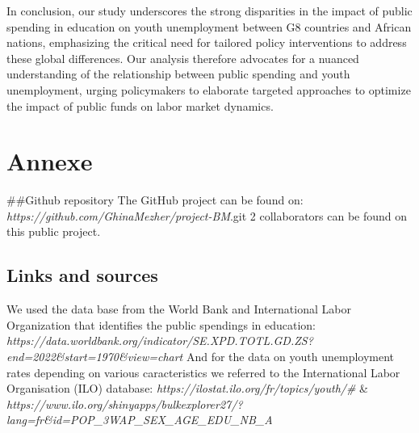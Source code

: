 \documentclass[
  letterpaper,
  DIV=11,
  numbers=noendperiod]{scrartcl}
\begin{document}
In conclusion, our study underscores the strong disparities in the
impact of public spending in education on youth unemployment between G8
countries and African nations, emphasizing the critical need for
tailored policy interventions to address these global differences. Our
analysis therefore advocates for a nuanced understanding of the
relationship between public spending and youth unemployment, urging
policymakers to elaborate targeted approaches to optimize the impact of
public funds on labor market dynamics.

\hypertarget{annexe}{%
\section{Annexe}\label{annexe}}

\#\#Github repository The GitHub project can be found on:
\emph{https://github.com/GhinaMezher/project-BM}.git 2 collaborators can
be found on this public project.

\hypertarget{links-and-sources}{%
\subsection{Links and sources}\label{links-and-sources}}

We used the data base from the World Bank and International Labor
Organization that identifies the public spendings in education:
\emph{https://data.worldbank.org/indicator/SE.XPD.TOTL.GD.ZS?end=2022\&start=1970\&view=chart}
And for the data on youth unemployment rates depending on various
caracteristics we referred to the International Labor Organisation (ILO)
database: \emph{https://ilostat.ilo.org/fr/topics/youth/\#} \&
\emph{https://www.ilo.org/shinyapps/bulkexplorer27/?lang=fr\&id=POP\_3WAP\_SEX\_AGE\_EDU\_NB\_A}
\end{document}
